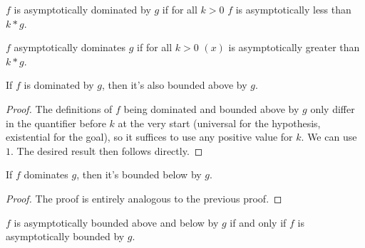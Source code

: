 \begin{definition}
    \label{def:asymp_right_dom}
    \leanok
    $f$ is asymptotically dominated by $g$ if for all $k > 0$ $f$ is asymptotically 
    less than $k*g$.

\end{definition}

\begin{definition}
    \label{def:asymp_left_dom}
    \leanok
    $f$ asymptotically dominates $g$ if for all $k > 0$ $(x)$ is asymptotically
    greater than $k*g$.

\end{definition}

\begin{lemma}
    \label{lemma:asymp_bounded_above_of_right_dom}
    \leanok
    If $f$ is dominated by $g$, then it's also bounded above by $g$.
\end{lemma}

\begin{proof}
    \leanok 
    The definitions of $f$ being dominated and bounded above by $g$ only differ
    in the quantifier before $k$ at the very start (universal for the hypothesis, existential
    for the goal), so it suffices to use any positive value for $k$. We can use $1$. 
    The desired result then follows directly.
\end{proof}

\begin{lemma}
    \label{lemma:asymp_bounded_below_of_left_dom}
    \leanok
    If $f$ dominates $g$, then it's bounded below by $g$.
\end{lemma}

\begin{proof}
    \leanok
    The proof is entirely analogous to the previous proof.
\end{proof}

\begin{lemma}
    \label{lemma:asymp_bounded_iff}
    \leanok
    $f$ is asymptotically bounded above and below by $g$ if and only if $f$ is 
    asymptotically bounded by $g$.
\end{lemma}

